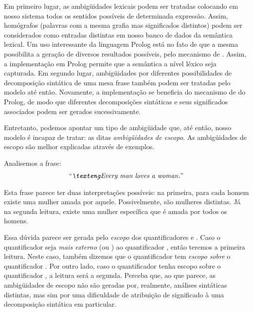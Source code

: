 Em primeiro lugar, as ambigüidades lexicais podem ser tratadas colocando em nosso sistema todos os sentidos possíveis de determinada expressão. Assim, homógrafos (palavras com a mesma grafia mas significados distintos) podem ser considerados como entradas distintas em nosso banco de dados da semântica lexical. Um uso interessante da linguagem Prolog está no fato de que a mesma possibilita a geração de diversos resultados possíveis, pelo mecanismo de . Assim, a implementação em Prolog permite que a semântica a nível léxico seja capturada. Em segundo lugar, ambigüidades por diferentes possibilidades de decomposição sintática de uma mesa frase também podem ser tratadas pelo modelo até então. Novamente, a implementação se beneficia do mecanismo de  do Prolog, de modo que diferentes decomposições sintáticas e seus significados associados podem ser gerados sucessivamente.


Entretanto, podemos apontar um tipo de ambigüidade que, até então, nosso modelo é incapaz de tratar: as ditas \textit{ambigüidades de escopo}. \cite[p.~105-109]{BlackburnBos:2005} As ambigüidades de escopo são melhor explicadas através de exemplos.

Analisemos a frase: 
\begin{align*}
\text{\expreng{Every man loves a woman.}}
\end{align*}%

Esta frase parece ter duas interpretações possíveis: na primeira, para cada homem existe uma mulher amada por aquele. Possivelmente, são mulheres distintas. Já na segunda leitura, existe uma mulher específica que é amada por todos os homens.

Essa dúvida parece ser gerada pelo \textit{escopo} dos quantificadores  e . Caso o quantificador  seja \textit{mais externo} (ou \textit{}) ao quantificador , então teremos a primeira leitura. Neste caso, também dizemos que o quantificador  tem \textit{escopo sobre} o quantificador . Por outro lado, caso o quantificador  tenha escopo sobre o quantificador , a leitura será a segunda. Perceba que, ao que parece, as ambigüidades de escopo não são geradas por, realmente, análises sintáticas distintas, mas sim por uma dificuldade de atribuição de significado à uma decomposição sintática em particular.

